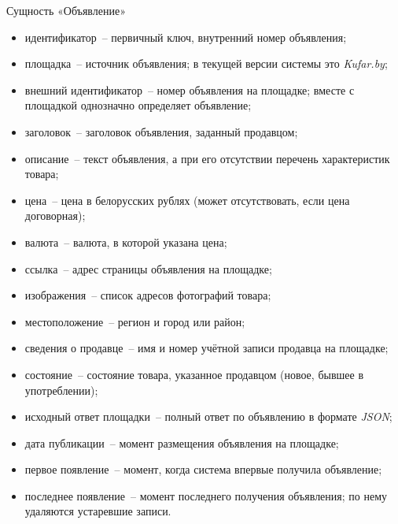Сущность «Объявление»
\begin{itemize}
	\item идентификатор~-- первичный ключ, внутренний номер объявления;
	\item площадка~-- источник объявления; в текущей версии системы это \textit{Kufar.by};
	\item внешний идентификатор~-- номер объявления на площадке; вместе с площадкой однозначно определяет объявление;
	\item заголовок~-- заголовок объявления, заданный продавцом;
	\item описание~-- текст объявления, а при его отсутствии перечень характеристик товара;
	\item цена~-- цена в белорусских рублях (может отсутствовать, если цена договорная);
	\item валюта~-- валюта, в которой указана цена;
	\item ссылка~-- адрес страницы объявления на площадке;
	\item изображения~-- список адресов фотографий товара;
	\item местоположение~-- регион и город или район;
	\item сведения о продавце~-- имя и номер учётной записи продавца на площадке;
	\item состояние~-- состояние товара, указанное продавцом (новое, бывшее в употреблении);
	\item исходный ответ площадки~-- полный ответ по объявлению в формате \textit{JSON};
	\item дата публикации~-- момент размещения объявления на площадке;
	\item первое появление~-- момент, когда система впервые получила объявление;
	\item последнее появление~-- момент последнего получения объявления; по нему удаляются устаревшие записи.
\end{itemize}

